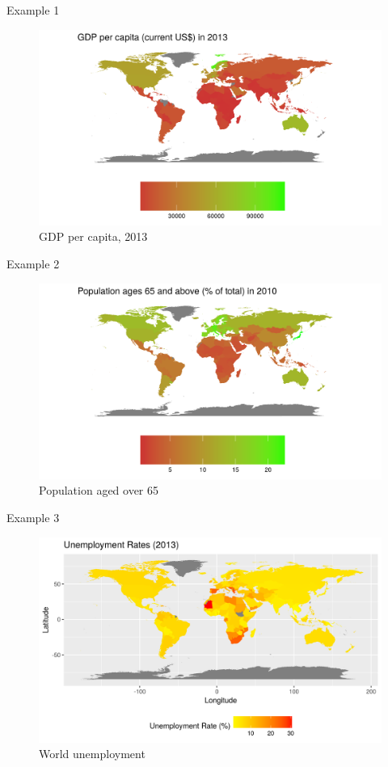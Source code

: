 \documentclass[9pt]{beamer}
\begin{document}
\begin{frame}{Example 1}
\begin{figure}
\centering
\includegraphics[width=\textwidth]{GDP.png}
\caption[GDP per capita, 2013]{GDP per capita, 2013}
\end{figure}

\end{frame}
\begin{frame}{Example 2}
\begin{figure}
\centering
\includegraphics[width=1\textwidth]{ageing.png}
\caption[Population aged over 65]{Population aged over 65}
\end{figure}
\end{frame}

\begin{frame}{Example 3}
\begin{figure}
\centering
\includegraphics[width=\textwidth]{unemploy.png}
\caption[World unemployment]{World unemployment}
\end{figure}
\end{frame}
\end{document}
